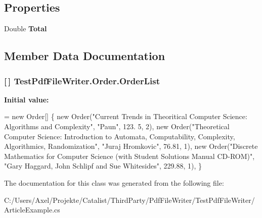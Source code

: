\subsection*{Properties}
\begin{DoxyCompactItemize}
\item 
Double {\bfseries Total}\hypertarget{class_test_pdf_file_writer_1_1_order_a77fbe9bbc5753b3636c87cad2fa8d0e0}{}\label{class_test_pdf_file_writer_1_1_order_a77fbe9bbc5753b3636c87cad2fa8d0e0}

\end{DoxyCompactItemize}


\subsection{Member Data Documentation}
\subsubsection[{\texorpdfstring{Order\+List}{OrderList}}]{ \mbox{[}$\,$\mbox{]} Test\+Pdf\+File\+Writer.\+Order.\+Order\+List\hspace{0.3cm}{\ttfamily [static]}}\hypertarget{class_test_pdf_file_writer_1_1_order_a3279d992c3850e5957a8826252f4ceac}{}\label{class_test_pdf_file_writer_1_1_order_a3279d992c3850e5957a8826252f4ceac}
{\bfseries Initial value\+:}
\begin{DoxyCode}
= \textcolor{keyword}{new} Order[]
        \{
        \textcolor{keyword}{new} Order(\textcolor{stringliteral}{"Current Trends in Theoritical Computer Science: Algorithms and Complexity"}, \textcolor{stringliteral}{"Paun"}, 123.
      5, 2),
        \textcolor{keyword}{new} Order(\textcolor{stringliteral}{"Theoretical Computer Science: Introduction to Automata, Computability, Complexity,
       Algorithmics, Randomization"}, \textcolor{stringliteral}{"Juraj Hromkovic"}, 76.81, 1),
        \textcolor{keyword}{new} Order(\textcolor{stringliteral}{"Discrete Mathematics for Computer Science (with Student Solutions Manual CD-ROM)"}, \textcolor{stringliteral}{"Gary
       Haggard, John Schlipf and Sue Whitesides"}, 229.88, 1),
        \}
\end{DoxyCode}


The documentation for this class was generated from the following file\+:\begin{DoxyCompactItemize}
\item 
C\+:/\+Users/\+Axel/\+Projekte/\+Catalist/\+Third\+Party/\+Pdf\+File\+Writer/\+Test\+Pdf\+File\+Writer/Article\+Example.\+cs\end{DoxyCompactItemize}
